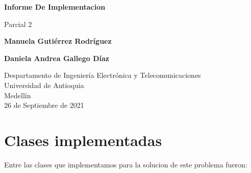 \documentclass{article}
\begin{document}
\begin{titlepage}
    \begin{center}
        \vspace*{1cm}
            
        \Huge
        \textbf{Informe De Implementacion}
            
        \vspace{0.5cm}
        \LARGE
        Parcial 2
            
        \vspace{1.5cm}
            
        \textbf{Manuela Gutiérrez Rodríguez}
        \vspace{0.5cm}
        
        \textbf{Daniela Andrea Gallego Díaz}
            
        \vfill
            
        \vspace{0.8cm}
            
        \Large
        Despartamento de Ingeniería Electrónica y Telecomunicaciones\\
        Universidad de Antioquia\\
        Medellín\\
        26 de Septiembre de 2021
            
    \end{center}
\end{titlepage}

\tableofcontents
\newpage
\section{Clases implementadas}

Entre las clases que implementamos para la solucion de este problema fueron:
\end{document}
